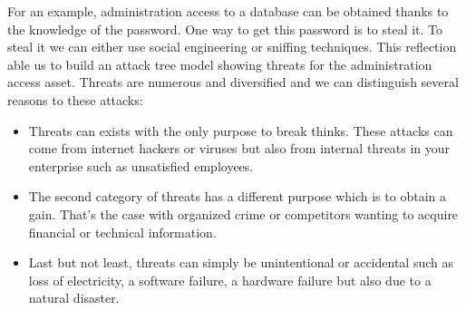 For an example, administration access to a database can be obtained
thanks to the knowledge of the password. One way to get this password is to
steal it. To steal it we can either use social engineering or sniffing
techniques. This reflection able us to build an attack tree model showing threats
for the administration access asset. Threats are numerous and diversified and we
can distinguish several reasons to these attacks: \begin{itemize}{} \item
Threats can exists with the only purpose to break thinks. These attacks can come
from internet hackers or viruses but also from internal threats in your
enterprise such as unsatisfied employees. \item The second category of threats
has a different purpose which is to obtain a gain. That's the case with
organized crime or competitors wanting to acquire financial or technical
information. \item Last but not least, threats can simply be unintentional or
accidental such as loss of electricity, a software failure, a hardware failure
but also due to a natural disaster. \end{itemize}

